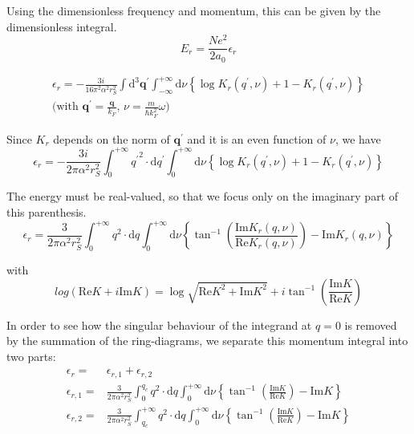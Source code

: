 Using the dimensionless frequency and momentum, this can be given by the dimensionless integral.
\begin{equation} \label{Eqs2.8.36}
E_r = \frac{N e^2}{2 a_0} \epsilon_r
\end{equation}

\[\begin{split} \epsilon_r = -\frac{3i}{16\pi^2 \alpha^2 r_S^2} \int \mathrm{d}^3 \mathbf{q}^{'}\int_{-\infty}^{+\infty} \mathrm{d}\nu \left\{ \log K_r(q^{'},\nu) + 1-K_r(q^{'},\nu) \right\}\\\text{(with $\mathbf{q}^{'} = \frac{\mathbf{q}}{k_F}$, $\nu = \frac{m}{\hbar k_F^2} \omega$)}\end{split} \]

Since $K_r$ depends on the norm of $\mathbf{q}^{'}$ and it is an even function of $\nu$, we have
\[ \epsilon_r = -\frac{3i}{2\pi \alpha^2 r_S^2} \int_0^{+\infty} {q^{'}}^2 \cdot \mathrm{d}q^{'} \int_{0}^{+\infty} \mathrm{d}\nu \left\{ \log K_r(q^{'},\nu) + 1-K_r(q^{'},\nu) \right\}\]

The energy must be real-valued, so that we focus only on the imaginary part of this parenthesis.
\begin{equation} \label{Eqs2.8.37}
\epsilon_r = \frac{3}{2\pi \alpha^2 r_S^2} \int_0^{+\infty} q^2 \cdot \mathrm{d}q \int_0^{+\infty} \mathrm{d}\nu \left\{ \tan^{-1}\left( \frac{\text{Im} K_r(q,\nu)}{\text{Re} K_r(q,\nu)} \right) - \text{Im} K_r(q,\nu) \right\}
\end{equation}

with
\begin{equation} \label{Eqs2.8.38}
log(\text{Re} K + i \text{Im} K) = \log \sqrt{\text{Re} K^2 + \text{Im} K^2} + i \tan^{-1} \left( \frac{\text{Im} K}{\text{Re} K} \right)
\end{equation}

In order to see how the singular behaviour of the integrand at $q=0$ is removed by the summation of the ring-diagrams, we separate this momentum integral into two parts:
\begin{eqnarray}
\epsilon_r =& \epsilon_{r,1} + \epsilon_{r,2} \nonumber\\
\epsilon_{r,1} =& \frac{3}{2\pi \alpha^2 r_S^2} \int_0^{q_c} q^2 \cdot \mathrm{d} q \int_0^{+\infty} \mathrm{d} \nu \left\{ \tan^{-1}\left( \frac{\text{Im} K}{\text{Re} K} \right) - \text{Im} K  \right\} \label{Eqs2.8.39}\\
\epsilon_{r,2} =& \frac{3}{2\pi \alpha^2 r_S^2} \int_{q_c}^{+\infty} q^2 \cdot \mathrm{d} q \int_0^{+\infty} \mathrm{d} \nu \left\{ \tan^{-1}\left( \frac{\text{Im} K}{\text{Re} K} \right) - \text{Im} K  \right\} \label{Eqs2.8.40}
\end{eqnarray}

